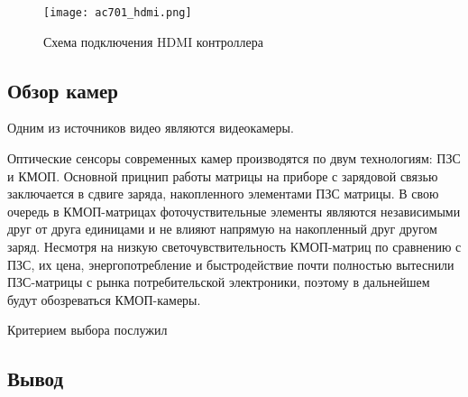 \begin{figure}[ht]
  \centering
  \texttt{[image: ac701\_hdmi.png]}
  \caption{ Схема подключения HDMI контроллера }
  \label{fig:domain:ac701:hdmi}
\end{figure}

\subsection{Обзор камер}
\label{sub:domain:camera}

Одним из источников видео являются видеокамеры.

Оптические сенсоры современных камер производятся по двум технологиям: ПЗС и КМОП.
Основной прицнип работы матрицы на приборе с зарядовой связью заключается в сдвиге заряда,
накопленного элементами ПЗС матрицы.
В свою очередь в КМОП-матрицах фоточуствительные элементы являются независимыми друг от друга единицами
и не влияют напрямую на накопленный друг другом заряд.
Несмотря на низкую светочувствительность КМОП-матриц по сравнению с ПЗС, их цена, энергопотребление и
быстродействие почти полностью вытеснили ПЗС-матрицы с рынка потребительской электроники, поэтому
в дальнейшем будут обозреваться КМОП-камеры.

Критерием выбора послужил

\subsection{Вывод}
\label{sub:domain:summary}


